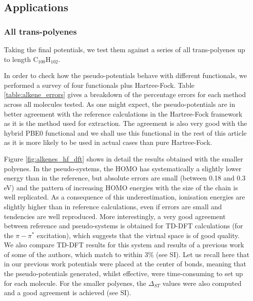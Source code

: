 \documentclass[12pt]{article}
\begin{document}
\subsection*{\sffamily \large Applications}

\subsubsection*{\sffamily \large All trans-polyenes}

Taking the final potentials, we test them against a series of all trans-polyenes up to length C\(_{100}\)H\(_{102}\).

In order to check how the pseudo-potentials behave with different functionals, we performed a survey of four functionals plus Hartree-Fock.
Table \ref{table:alkene_errors} gives a breakdown of the percentage errors for each method across all molecules tested.
As one might expect, the pseudo-potentials are in better agreement with the reference calculations in the Hartree-Fock framework as it is the method used for extraction.
The agreement is also very good with the hybrid PBE0 functional and we shall use this functional in the rest of this article as it is more likely to be used in actual cases than pure Hartree-Fock.

Figure \ref{fig:alkenes_hf_dft} shows in detail the results obtained with the smaller polyenes.
In the pseudo-systems, the HOMO has systematically a slightly lower energy than in the reference, but absolute errors are small (between 0.18 and 0.3 eV) and the pattern of increasing HOMO energies with the size of the chain is well replicated. As a consequence of this underestimation, 
ionisation energies are slightly higher than in reference calculations, even if errors are small and tendencies are well reproduced. 
More interestingly, a very good agreement between reference and pseudo-systems is obtained for TD-DFT
calculations (for the $\pi-\pi^*$ excitation), which suggests that the virtual space is of good
quality.
We also compare TD-DFT results for this system and results of a previous work of some of the authors, which match to within 3\% (see SI).\cite{drujon_pseudopotentials_2013}
Let us recall here that in our previous work potentials were placed at the center of bonds, meaning that the pseudo-potentials generated, whilst effective, were time-consuming to set up for each molecule.
For the smaller polyenes, the $\Delta_{ST}$ values were also computed and a good agreement is achieved (see SI).
\end{document}

